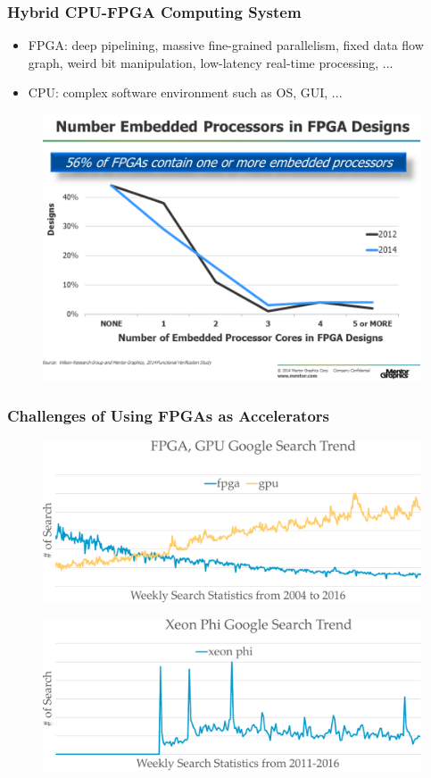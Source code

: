 \documentclass[accentcolor=tud1a,colorbacktitle,inverttitle,landscape,german,presentation,t]{tudbeamer}
\begin{document}
  \begin{frame}
  \frametitle{Hybrid CPU-FPGA Computing System}
    \vspace{-0.7em}
    \begin{itemize}
    \item FPGA: deep pipelining, massive fine-grained parallelism, 
      fixed data flow graph, weird bit manipulation, low-latency 
      real-time processing, ...
    \item CPU: complex software environment such as OS, GUI, ...
    \end{itemize}
    \begin{figure}
      \includegraphics[width=.6\linewidth]{fpga-accelerator}
    \end{figure}
  \end{frame}

  \begin{frame}
  \frametitle{Challenges of Using FPGAs as Accelerators}
    \vspace{-1em}
    \begin{figure}
      \includegraphics[width=.6\linewidth]{gpu-trend}
    \end{figure}
    \begin{figure}
      \includegraphics[width=.6\linewidth]{xeon-trend}
    \end{figure}
  \end{frame}
   
\end{document}
